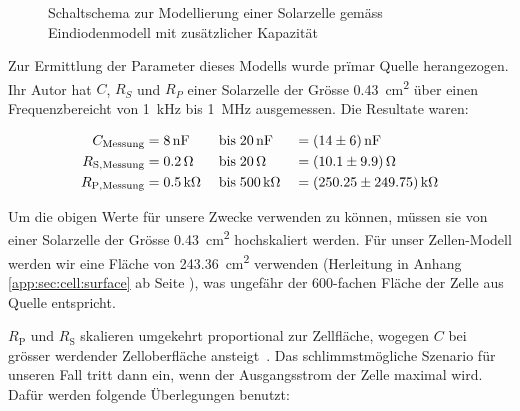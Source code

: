 \begin{figure}[h!tb]
    \centering
    
    \caption{%
        Schaltschema    zur    Modellierung    einer    Solarzelle    gem\"ass
        Eindiodenmodell mit zus\"atzlicher Kapazit\"at%
    }
    \label{fig:circuit:solarCell}
\end{figure}

Zur   Ermittlung  der   Parameter   dieses  Modells   wurde  pr\"imar   Quelle
\cite{ref:solar:scofield}  herangezogen. Ihr   Autor  hat  $C$,   $R_{S}$  und
$R_{P}$ einer  Solarzelle der Gr\"osse  \SI{0.43}{\centi\meter\squared} \"uber
einen   Frequenzbereicht  von   \SI{1}{\kilo\hertz}  bis   \SI{1}{\mega\hertz}
ausgemessen. Die Resultate waren:

\begin{alignat}{3}
    \label{eq:scofield:C}
    C_{\mathrm{Messung}}    &= \SI{8}{\nano\farad} \; & \text{bis} \; & \SI{20}{\nano\farad} \;  & = & \; \SI{14 \pm 6}{\nano\farad} \\
    \label{eq:scofield:Rs}
    R_{\mathrm{S, Messung}} &= \SI{0.2}{\ohm}      \; & \text{bis} \; & \SI{20}{\ohm}        \;  & = & \; \SI{10.1 \pm 9.9}{\ohm}     \\
    \label{eq:scofield:Rp}
    R_{\mathrm{P, Messung}} &= \SI{0.5}{\kilo\ohm} \; & \text{bis} \; & \SI{500}{\kilo\ohm}  \;  & = & \; \SI{250.25 \pm 249.75}{\kilo\ohm}
\end{alignat}

Um  die obigen  Werte  f\"ur  unsere Zwecke  verwenden  zu k\"onnen,  m\"ussen
sie   von  einer   Solarzelle  der   Gr\"osse  \SI{0.43}{\centi\meter\squared}
hochskaliert    werden. F\"ur   unser    Zellen-Modell    werden   wir    eine
Fl\"ache  von   \SI{243.36}{\centi\meter\squared}  verwenden   (Herleitung  in
Anhang  \ref{app:sec:cell:surface}  ab Seite  \pageref{app:sec:cell:surface}),
was   ungef\"ahr    der   600-fachen    Fl\"ache   der   Zelle    aus   Quelle
\cite{ref:solar:scofield} entspricht.

$R_{\mathrm{P}}$   und  $R_{\mathrm{S}}$   skalieren  umgekehrt   proportional
zur  Zellfl\"ache,  wogegen  $C$   bei  gr\"osser  werdender  Zelloberfl\"ache
ansteigt~\cite{ref:solar:scofield}. Das  schlimmstm\"ogliche   Szenario  f\"ur
unseren  Fall  tritt  dann  ein,  wenn der  Ausgangsstrom  der  Zelle  maximal
wird. Daf\"ur werden folgende \"Uberlegungen benutzt:

